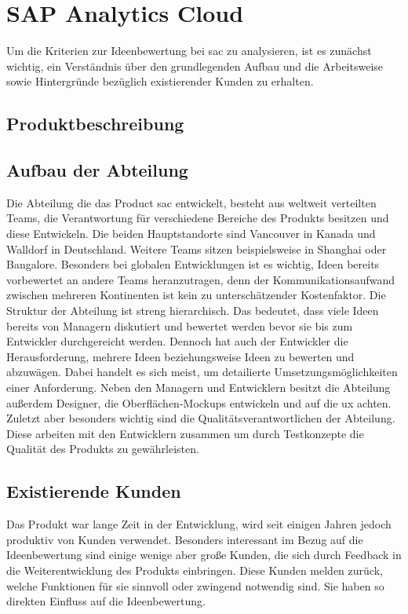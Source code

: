 \newpage
\section{SAP Analytics Cloud}\label{sec:sac}
Um die Kriterien zur Ideenbewertung bei \ac{sac} zu analysieren, ist es zunächst 
wichtig, ein Verständnis über den grundlegenden Aufbau und die Arbeitsweise sowie Hintergründe bezüglich 
existierender Kunden zu erhalten. 

\subsection{Produktbeschreibung}

\subsection{Aufbau der Abteilung}
Die Abteilung die das Product \ac{sac} entwickelt, besteht aus weltweit verteilten Teams, 
die Verantwortung für verschiedene Bereiche des Produkts besitzen und diese Entwickeln. 
Die beiden Hauptstandorte sind Vancouver in Kanada und Walldorf in Deutschland. Weitere Teams sitzen beispielsweise in 
Shanghai oder Bangalore. Besonders bei globalen Entwicklungen ist es wichtig, Ideen bereits vorbewertet an andere Teams 
heranzutragen, denn der Kommunikationsaufwand zwischen mehreren Kontinenten ist kein zu unterschätzender Kostenfaktor. 
Die Struktur der Abteilung ist streng hierarchisch. Das bedeutet, dass viele Ideen bereits von Managern diskutiert und 
bewertet werden bevor sie bis zum Entwickler durchgereicht werden. Dennoch hat auch der Entwickler die Herausforderung, 
mehrere Ideen beziehungsweise Ideen zu bewerten und abzuwägen. Dabei handelt es sich meist, um detailierte Umsetzungsmöglichkeiten
einer Anforderung. 
Neben den Managern und Entwicklern besitzt die Abteilung außerdem Designer, die Oberflächen-Mockups entwickeln und auf
die \ac{ux} achten. Zuletzt aber besonders wichtig sind die Qualitätsverantwortlichen der Abteilung. Diese 
arbeiten mit den Entwicklern zusammen um durch Testkonzepte die Qualität des Produkts zu gewährleisten.

\subsection{Existierende Kunden}
Das Produkt war lange Zeit in der Entwicklung, wird seit einigen Jahren jedoch produktiv von Kunden verwendet. Besonders 
interessant im Bezug auf die Ideenbewertung sind einige wenige aber große Kunden, die sich durch Feedback in die 
Weiterentwicklung des Produkts einbringen. Diese Kunden melden zurück, welche Funktionen für sie sinnvoll oder 
zwingend notwendig sind. Sie haben so direkten Einfluss auf die Ideenbewertung. 

